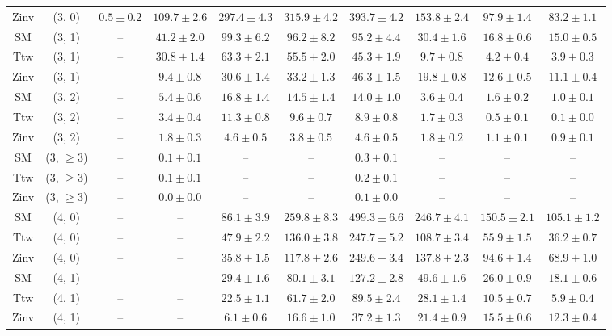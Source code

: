 \begin{table}[h!]
{\begin{tabular}{cccccccccc}
	Zinv & (3, 0) & $0.5\pm 0.2$ & $109.7\pm 2.6$ & $297.4\pm 4.3$ & $315.9\pm 4.2$ & $393.7\pm 4.2$ & $153.8\pm 2.4$ & $97.9\pm 1.4$ & $83.2\pm 1.1$ \\[0.5ex] 
	SM & (3, 1) & -- & $41.2\pm 2.0$ & $99.3\pm 6.2$ & $96.2\pm 8.2$ & $95.2\pm 4.4$ & $30.4\pm 1.6$ & $16.8\pm 0.6$ & $15.0\pm 0.5$ \\[0.5ex] 
	Ttw & (3, 1) & -- & $30.8\pm 1.4$ & $63.3\pm 2.1$ & $55.5\pm 2.0$ & $45.3\pm 1.9$ & $9.7\pm 0.8$ & $4.2\pm 0.4$ & $3.9\pm 0.3$ \\[0.5ex] 
	Zinv & (3, 1) & -- & $9.4\pm 0.8$ & $30.6\pm 1.4$ & $33.2\pm 1.3$ & $46.3\pm 1.5$ & $19.8\pm 0.8$ & $12.6\pm 0.5$ & $11.1\pm 0.4$ \\[0.5ex] 
	SM & (3, 2) & -- & $5.4\pm 0.6$ & $16.8\pm 1.4$ & $14.5\pm 1.4$ & $14.0\pm 1.0$ & $3.6\pm 0.4$ & $1.6\pm 0.2$ & $1.0\pm 0.1$ \\[0.5ex] 
	Ttw & (3, 2) & -- & $3.4\pm 0.4$ & $11.3\pm 0.8$ & $9.6\pm 0.7$ & $8.9\pm 0.8$ & $1.7\pm 0.3$ & $0.5\pm 0.1$ & $0.1\pm 0.0$ \\[0.5ex] 
	Zinv & (3, 2) & -- & $1.8\pm 0.3$ & $4.6\pm 0.5$ & $3.8\pm 0.5$ & $4.6\pm 0.5$ & $1.8\pm 0.2$ & $1.1\pm 0.1$ & $0.9\pm 0.1$ \\[0.5ex] 
	SM & (3, $\ge3$) & -- & $0.1\pm 0.1$ & -- & -- & $0.3\pm 0.1$ & -- & -- & -- \\[0.5ex] 
	Ttw & (3, $\ge3$) & -- & $0.1\pm 0.1$ & -- & -- & $0.2\pm 0.1$ & -- & -- & -- \\[0.5ex] 
	Zinv & (3, $\ge3$) & -- & $0.0\pm 0.0$ & -- & -- & $0.1\pm 0.0$ & -- & -- & -- \\[0.5ex] 
	SM & (4, 0) & -- & -- & $86.1\pm 3.9$ & $259.8\pm 8.3$ & $499.3\pm 6.6$ & $246.7\pm 4.1$ & $150.5\pm 2.1$ & $105.1\pm 1.2$ \\[0.5ex] 
	Ttw & (4, 0) & -- & -- & $47.9\pm 2.2$ & $136.0\pm 3.8$ & $247.7\pm 5.2$ & $108.7\pm 3.4$ & $55.9\pm 1.5$ & $36.2\pm 0.7$ \\[0.5ex] 
	Zinv & (4, 0) & -- & -- & $35.8\pm 1.5$ & $117.8\pm 2.6$ & $249.6\pm 3.4$ & $137.8\pm 2.3$ & $94.6\pm 1.4$ & $68.9\pm 1.0$ \\[0.5ex] 
	SM & (4, 1) & -- & -- & $29.4\pm 1.6$ & $80.1\pm 3.1$ & $127.2\pm 2.8$ & $49.6\pm 1.6$ & $26.0\pm 0.9$ & $18.1\pm 0.6$ \\[0.5ex] 
	Ttw & (4, 1) & -- & -- & $22.5\pm 1.1$ & $61.7\pm 2.0$ & $89.5\pm 2.4$ & $28.1\pm 1.4$ & $10.5\pm 0.7$ & $5.9\pm 0.4$ \\[0.5ex] 
	Zinv & (4, 1) & -- & -- & $6.1\pm 0.6$ & $16.6\pm 1.0$ & $37.2\pm 1.3$ & $21.4\pm 0.9$ & $15.5\pm 0.6$ & $12.3\pm 0.4$ \\[0.5ex] 

\end{tabular}}
\end{table}
